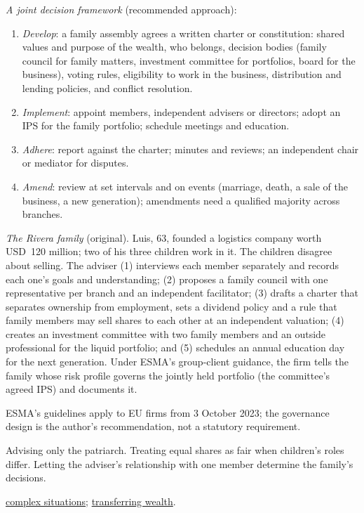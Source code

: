 \begin{qfmethod}
\emph{A joint decision framework} (recommended approach):
\begin{enumerate}
\item \emph{Develop}: a family assembly agrees a written charter or constitution: shared values and purpose of the wealth, who belongs, decision bodies (family council for family matters, investment committee for portfolios, board for the business), voting rules, eligibility to work in the business, distribution and lending policies, and conflict resolution.
\item \emph{Implement}: appoint members, independent advisers or directors; adopt an IPS for the family portfolio; schedule meetings and education.
\item \emph{Adhere}: report against the charter; minutes and reviews; an independent chair or mediator for disputes.
\item \emph{Amend}: review at set intervals and on events (marriage, death, a sale of the business, a new generation); amendments need a qualified majority across branches.
\end{enumerate}

 \emph{The Rivera family} (original). Luis, 63, founded a logistics company worth USD~120 million; two of his three children work in it. The children disagree about selling. The adviser (1) interviews each member separately and records each one's goals and understanding; (2) proposes a family council with one representative per branch and an independent facilitator; (3) drafts a charter that separates ownership from employment, sets a dividend policy and a rule that family members may sell shares to each other at an independent valuation; (4) creates an investment committee with two family members and an outside professional for the liquid portfolio; and (5) schedules an annual education day for the next generation. Under ESMA's group-client guidance, the firm tells the family whose risk profile governs the jointly held portfolio (the committee's agreed IPS) and documents it.

 ESMA's guidelines apply to EU firms from 3 October 2023; the governance design is the author's recommendation, not a statutory requirement.

 Advising only the patriarch. Treating equal shares as fair when children's roles differ. Letting the adviser's relationship with one member determine the family's decisions.

 \hyperref[meth:complex-client-situations]{complex situations}; \hyperref[meth:wealth-transfer-strategies]{transferring wealth}.

\end{qfmethod}
